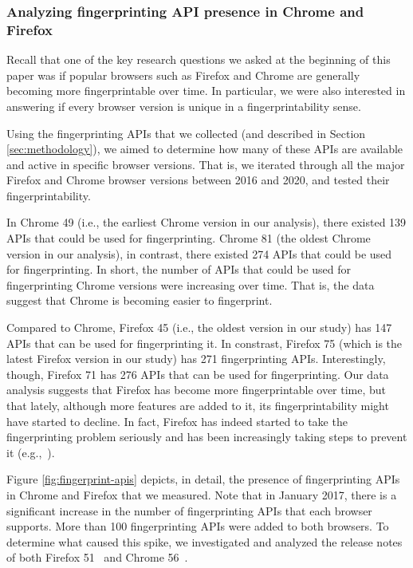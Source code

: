 \subsubsection{Analyzing fingerprinting API presence in Chrome and
  Firefox}

Recall that one of the key research questions we asked at the beginning of
this paper was if popular browsers such as Firefox and Chrome are
generally becoming more fingerprintable over time. In particular, we
were also interested in answering if every browser version is unique
in a fingerprintability sense.

Using the fingerprinting APIs that we collected (and described in
Section \ref{sec:methodology}), we aimed to determine how many of
these APIs are available and active in specific browser versions. That
is, we iterated through all the major Firefox and Chrome browser
versions between 2016 and 2020, and tested their fingerprintability.

In Chrome 49 (i.e., the earliest Chrome version in our analysis),
there existed 139 APIs that could be used for fingerprinting. Chrome
81 (the oldest Chrome version in our analysis), in contrast, there
existed 274 APIs that could be used for fingerprinting. In short, the
number of APIs that could be used for fingerprinting Chrome versions
were increasing over time. That is, the data suggest that Chrome is
becoming easier to fingerprint.

Compared to Chrome, Firefox 45 (i.e., the oldest version in our study)
has 147 APIs that can be used for fingerprinting it. In constrast,
Firefox 75 (which is the latest Firefox version in our study) has 271
fingerprinting APIs. Interestingly, though, Firefox 71 has 276 APIs
that can be used for fingerprinting. Our data analysis suggests that
Firefox has become more fingerprintable over time, but that lately,
although more features are added to it, its fingerprintability might
have started to decline. In fact, Firefox has indeed started to take
the fingerprinting problem seriously and has been increasingly taking
steps to prevent it (e.g.,~\cite{FirefoxFingerprinting}).

Figure \ref{fig:fingerprint-apis} depicts, in detail, the presence of
fingerprinting APIs in Chrome and Firefox that we measured. Note that
in January 2017, there is a significant increase in the number of
fingerprinting APIs that each browser supports. More than 100
fingerprinting APIs were added to both browsers. To determine what
caused this spike, we investigated and analyzed the release notes of
both Firefox 51~\cite{firefox-51-notes} and Chrome
56~\cite{chrome-56-notes}.

